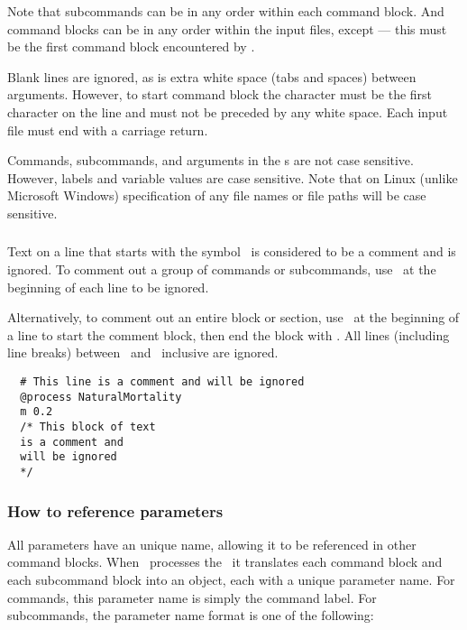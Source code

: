 Note that subcommands can be in any order within each command block. And command blocks can be in any order within the input files, except  --- this must be the first command block encountered by \CNAME.

Blank lines are ignored, as is extra white space (tabs and spaces) between arguments. However, to start command block the \command{} character must be the first character on the line and must not be preceded by any white space. Each input file must end with a carriage return.

Commands, subcommands, and arguments in the \config s are not case sensitive. However, labels and variable values are case sensitive. Note that on Linux (unlike Microsoft Windows) specification of any file names or file paths will be case sensitive.

\subsubsection{}

Text on a line that starts with the symbol \commentline\ is considered to be a comment and is ignored. To comment out a group of commands or subcommands, use \commentline\ at the beginning of each line to be ignored.

Alternatively, to comment out an entire block or section, use \commentstart\ at the beginning of a line to start the comment block, then end the block with \commentend. All lines (including line breaks) between \commentstart\ and \commentend\ inclusive are ignored.

\small{\begin{verbatim}
  # This line is a comment and will be ignored
  @process NaturalMortality
  m 0.2
  /* This block of text
  is a comment and
  will be ignored
  */
\end{verbatim}}

\subsubsection{How to reference parameters\label{sec:parameter-names}}

All parameters have an unique name, allowing it to be referenced in other command blocks. When \CNAME\ processes the \config\ it translates each command block and each subcommand block into an object, each with a unique parameter name. For commands, this parameter name is simply the command label. For subcommands, the parameter name format is one of the following:

